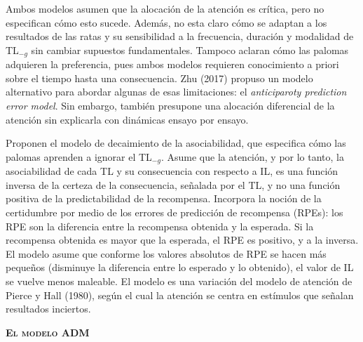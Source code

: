 \documentclass[a4paper,12pt]{article}
\begin{document}
Ambos modelos asumen que la alocación de la atención es crítica, pero no especifican cómo esto sucede. Además, no esta claro cómo se adaptan a los resultados de las ratas y su sensibilidad a la frecuencia, duración y modalidad de TL$_{-g}$ sin cambiar supuestos fundamentales. Tampoco aclaran cómo las palomas adquieren la preferencia, pues ambos modelos requieren conocimiento a priori sobre el tiempo hasta una consecuencia.  Zhu (2017) propuso un modelo alternativo para abordar algunas de esas limitaciones: el {\itshape anticiparoty prediction error model}. Sin embargo, también presupone una alocación diferencial de la atención sin explicarla con dinámicas ensayo por ensayo.

Proponen el modelo de decaimiento de la asociabilidad, que especifica cómo las palomas aprenden a ignorar el TL$_{-g}$. Asume que la atención, y por lo tanto, la asociabilidad de cada TL y su consecuencia con respecto a IL, es una función inversa de la certeza de la consecuencia, señalada por el TL, y no una función positiva de la predictabilidad de la recompensa. Incorpora la noción de la certidumbre por medio de los errores de predicción de recompensa (RPEs): los RPE son la diferencia entre la recompensa obtenida y la esperada. Si la recompensa obtenida es mayor que la esperada, el RPE es positivo, y a la inversa. El modelo asume que conforme los valores absolutos de RPE se hacen más pequeños (disminuye la diferencia entre lo esperado y lo obtenido), el valor de IL se vuelve menos maleable. El modelo es una variación del modelo de atención de Pierce y Hall (1980), según el cual la atención se centra en estímulos que señalan resultados inciertos.

{\scshape\bfseries El modelo ADM}
\end{document}
